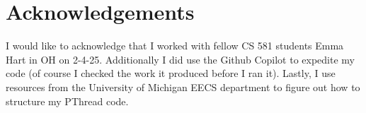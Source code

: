 \documentclass[a4paper,12pt]{article}
\theoremstyle{definition}
\theoremstyle{remark}
\begin{document}
	
	
	\section*{Acknowledgements}
	I would like to acknowledge that I worked with fellow CS 581 students Emma Hart in OH on 2-4-25. Additionally I did use the Github Copilot to expedite my code (of course I checked the work it produced before I ran it). Lastly, I use resources from the University of Michigan EECS department to figure out how to structure my PThread code.
	
\end{document}
